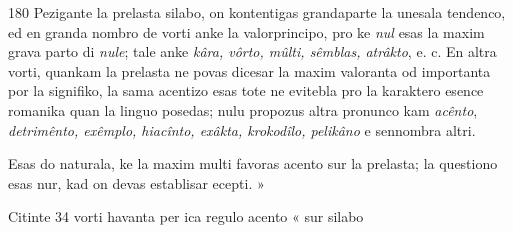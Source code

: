 \begin{VUpage}[184]{180}
Pezigante la prelasta silabo, on kontentigas grandaparte\nl
la unesala tendenco, ed en granda nombro de vorti anke\nl
la valorprincipo, pro ke \textit{nul} esas la maxim grava parto di\nl
\textit{nule}; tale anke \textit{kâra, vôrto, mûlti, sêmblas, atrâkto}, e. c. En\nl
altra vorti, quankam la prelasta ne povas dicesar la maxim\nl
valoranta od importanta por la signifiko, la sama acentizo\nl
esas tote ne evitebla pro la karaktero esence romanika quan\nl
la linguo posedas; nulu propozus altra pronunco kam \textit{acênto},\nl
\textit{detrimênto, exêmplo, hiacînto, exâkta, krokodîlo, pelikâno} e\nl
sennombra altri.

Esas do naturala, ke la maxim multi favoras acento sur\nl
la prelasta; la questiono esas nur, kad on devas establisar\nl
ecepti. »

Citinte 34 vorti havanta per ica regulo acento « sur silabo\parplein
\end{VUpage}

